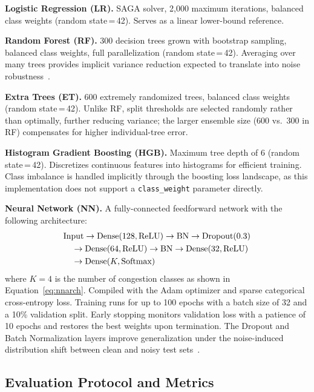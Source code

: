 \documentclass[conference,onecolumn,12pt]{IEEEtran}
\begin{document}
\textbf{Logistic Regression (LR).} SAGA solver, 2,000 maximum iterations,
balanced class weights (random state\,=\,42). Serves as a linear lower-bound
reference.

\textbf{Random Forest (RF).} 300 decision trees grown with bootstrap
sampling, balanced class weights, full parallelization
(random state\,=\,42). Averaging over many trees provides implicit variance
reduction expected to translate into noise robustness~\cite{ting2021}.

\textbf{Extra Trees (ET).} 600 extremely randomized trees, balanced class
weights (random state\,=\,42). Unlike RF, split thresholds are selected
randomly rather than optimally, further reducing variance; the larger
ensemble size (600 vs.\ 300 in RF) compensates for higher individual-tree
error.

\textbf{Histogram Gradient Boosting (HGB).} Maximum tree depth of 6
(random state\,=\,42). Discretizes continuous features into histograms for
efficient training. Class imbalance is handled implicitly through the boosting
loss landscape, as this implementation does not support a \texttt{class\_weight}
parameter directly.

\textbf{Neural Network (NN).} A fully-connected feedforward network with the
following architecture:
\begin{align}
  &\text{Input}
   \to \mathrm{Dense}(128,\text{ReLU})
   \to \mathrm{BN}
   \to \mathrm{Dropout}(0.3) \notag \\
  &\quad\to \mathrm{Dense}(64,\text{ReLU})
   \to \mathrm{BN}
   \to \mathrm{Dense}(32,\text{ReLU}) \notag \\
  &\quad\to \mathrm{Dense}(K,\text{Softmax}) \label{eq:nnarch}
\end{align}
where $K = 4$ is the number of congestion classes as shown in
Equation~\eqref{eq:nnarch}. Compiled with the Adam
optimizer and sparse categorical cross-entropy loss. Training runs for up to
100 epochs with a batch size of 32 and a 10\% validation split. Early stopping
monitors validation loss with a patience of 10 epochs and restores the best
weights upon termination. The Dropout and Batch Normalization layers improve
generalization under the noise-induced distribution shift between clean and
noisy test sets~\cite{ibias2024}.

\subsection{Evaluation Protocol and Metrics}
\end{document}
